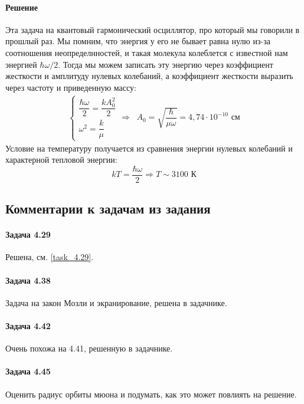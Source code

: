 \documentclass[12pt]{article}
\begin{document}
\paragraph{Решение}
Эта задача на квантовый гармонический осциллятор, про который мы говорили в прошлый раз. Мы помним, что энергия у его не бывает равна нулю из-за соотношения неопределнностей, и такая молекула колеблется с известной нам энергией $\hbar \omega/2$. Тогда мы можем записать эту энергию через коэффициент жесткости и амплитуду нулевых колебаний, а коэффициент жесткости выразить через частоту и приведенную массу:
\begin{gather*}
    \begin{cases}
       \dfrac{\hbar \omega}{2} = \dfrac{kA_0^2}{2}\\
       \omega^2 = \dfrac{k}{\mu}
    \end{cases} \Rightarrow \;\; A_0 = \sqrt{\dfrac{\hbar}{\mu \omega}} = 4,74\cdot 10^{-10} \text{ см}
\end{gather*}
Условие на температуру получается из сравнения энергии нулевых колебаний и характерной тепловой энергии:
\begin{equation*}
    kT = \dfrac{\hbar \omega}{2} \Rightarrow T\sim 3100 \text{ К}
\end{equation*}


\subsection{Комментарии к задачам из задания}
\paragraph{Задача 4.29} Решена, см. \ref{task_4.29}.
\paragraph{Задача 4.38} Задача на закон Мозли и экранирование, решена в задачнике.
\paragraph{Задача 4.42} Очень похожа на 4.41, решенную в задачнике.
\paragraph{Задача 4.45} Оценить радиус орбиты мюона и подумать, как это может повлиять на решение. 
\end{document}
